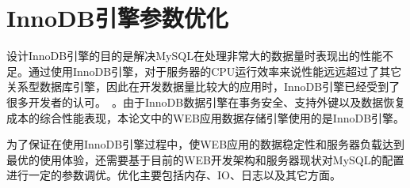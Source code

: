 \section{InnoDB引擎参数优化}

设计InnoDB引擎的目的是解决MySQL在处理非常大的数据量时表现出的性能不足。通过使用InnoDB引擎，对于服务器的CPU运行效率来说性能远远超过了其它关系型数据库引擎，因此在开发数据量比较大的应用时，InnoDB引擎已经受到了很多开发者的认可。~\cite{schwartz2012high}。由于InnoDB数据引擎在事务安全、支持外键以及数据恢复成本的综合性能表现，本论文中的WEB应用数据存储引擎使用的是InnoDB引擎。

为了保证在使用InnoDB引擎过程中，使WEB应用的数据稳定性和服务器负载达到最优的使用体验，还需要基于目前的WEB开发架构和服务器现状对MySQL的配置进行一定的参数调优。优化主要包括内存、IO、日志以及其它方面\cite{顾治华2006mysql}。

